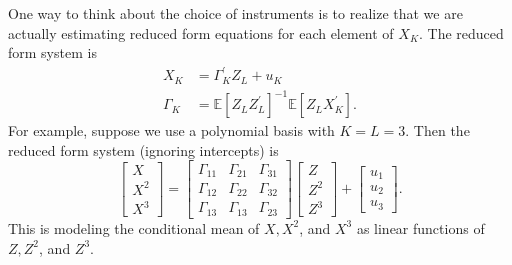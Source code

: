 \documentclass[10pt]{article}
\begin{document}
One way to think about the choice of instruments is to realize that we are actually estimating reduced form equations for each element of $X_{K}$. The reduced form system is
$$
\begin{aligned}
X_{K} &=\Gamma_{K}^{\prime} Z_{L}+u_{K} \\
\Gamma_{K} &=\mathbb{E}\left[Z_{L} Z_{L}^{\prime}\right]^{-1} \mathbb{E}\left[Z_{L} X_{K}^{\prime}\right] .
\end{aligned}
$$
For example, suppose we use a polynomial basis with $K=L=3$. Then the reduced form system (ignoring intercepts) is
$$
\left[\begin{array}{c}
X \\
X^{2} \\
X^{3}
\end{array}\right]=\left[\begin{array}{lll}
\Gamma_{11} & \Gamma_{21} & \Gamma_{31} \\
\Gamma_{12} & \Gamma_{22} & \Gamma_{32} \\
\Gamma_{13} & \Gamma_{13} & \Gamma_{23}
\end{array}\right]\left[\begin{array}{c}
Z \\
Z^{2} \\
Z^{3}
\end{array}\right]+\left[\begin{array}{l}
u_{1} \\
u_{2} \\
u_{3}
\end{array}\right] .
$$
This is modeling the conditional mean of $X, X^{2}$, and $X^{3}$ as linear functions of $Z, Z^{2}$, and $Z^{3}$.
\end{document}
